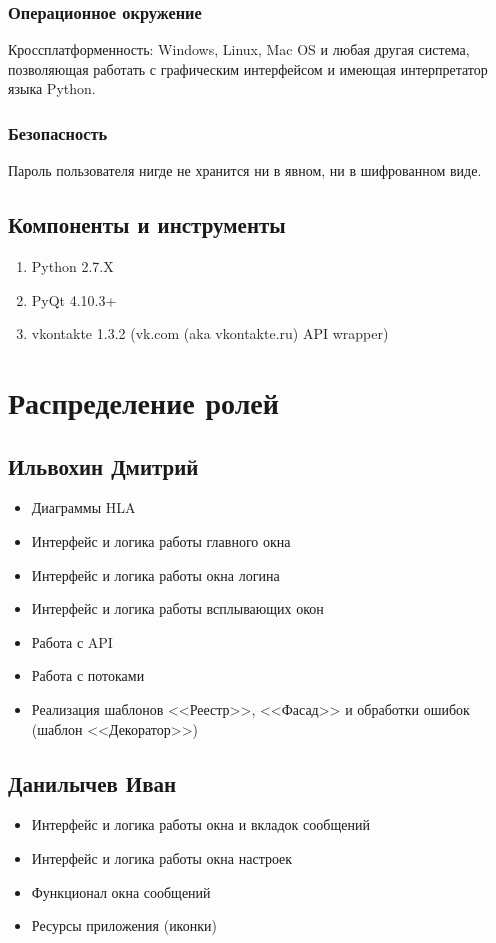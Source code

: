 \documentclass[12pt]{article}
\begin{document}
\subsubsection{Операционное окружение}
Кроссплатформенность: Windows, Linux, Mac OS и любая другая система, позволяющая работать с графическим интерфейсом и имеющая интерпретатор языка Python.

\subsubsection{Безопасность}
Пароль пользователя нигде не хранится ни в явном, ни в шифрованном виде.

\subsection{Компоненты и инструменты} 
\begin{enumerate}
\item Python 2.7.X
\item PyQt 4.10.3+
\item vkontakte 1.3.2 (vk.com (aka vkontakte.ru) API wrapper)
\end{enumerate}



\newpage
\section{Распределение ролей}
\subsection{Ильвохин Дмитрий}
\begin{itemize}
\setlength{\itemsep}{-1mm} %
\item Диаграммы HLA
\item Интерфейс и логика работы главного окна
\item Интерфейс и логика работы окна логина
\item Интерфейс и логика работы всплывающих окон
\item Работа с API
\item Работа с потоками
\item Реализация шаблонов <<Реестр>>, <<Фасад>> и обработки ошибок (шаблон <<Декоратор>>)
\end{itemize}

\subsection{Данилычев Иван}
\begin{itemize}
\setlength{\itemsep}{-1mm}
\item Интерфейс и логика работы окна и вкладок сообщений
\item Интерфейс и логика работы окна настроек
\item Функционал окна сообщений
\item Ресурсы приложения (иконки)
\end{itemize}
\end{document}

